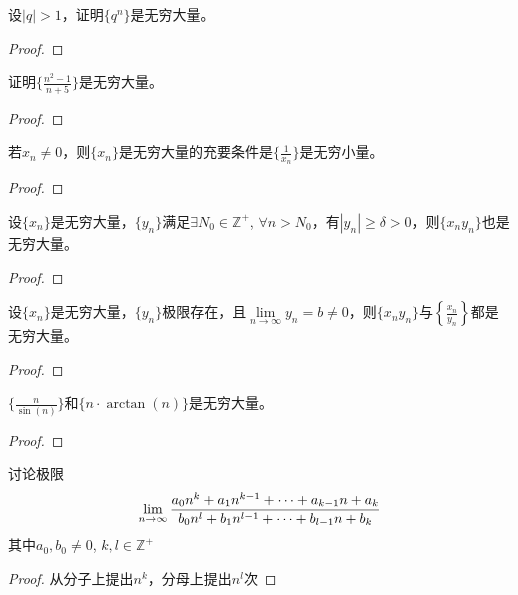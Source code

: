 \documentclass[lang=cn]{elegantbook}
\begin{document}
\begin{proposition}
    设$| q | > 1$，证明$\{ q^n \}$是无穷大量。 
\end{proposition}
\begin{proof}
    
\end{proof}

\begin{proposition}
    证明$\{ \frac{n^2-1}{n+5} \}$是无穷大量。 
\end{proposition}
\begin{proof}
    
\end{proof}

\begin{lemma}\label{lemma:inverse}
    若$x_n \neq 0$，则$\{ x_n \}$是无穷大量的充要条件是$\{ \frac{1}{x_n} \}$是无穷小量。    
\end{lemma}
\begin{proof}

\end{proof}

\begin{lemma}
    设$\{ x_n \}$是无穷大量，$\{ y_n \}$满足$\exists N_0 \in \mathbb{Z}^+$, $\forall n > N_0$，有$| y_n | \ge \delta > 0$，则$\{ x_n y_n\}$也是无穷大量。
\end{lemma}
\begin{proof}
\end{proof}

\begin{lemma}
    设$\{ x_n \}$是无穷大量，$\{ y_n \}$极限存在，且$\lim\limits_{n \to \infty}y_n = b \ne 0$，则$\{ x_n y_n\}$与$\left\{ \frac{x_n}{y_n} \right\}$都是无穷大量。
\end{lemma}
\begin{proof}
\end{proof}

\begin{proposition}
    $\{ \frac{n}{\sin(n)}\}$和$\{ n \cdot \arctan(n)\}$是无穷大量。
\end{proposition}
\begin{proof}
\end{proof}

\begin{proposition}
    讨论极限
    \[ \lim_{n \to \infty} \frac{a_0 n^k + a_1 n^{k - 1} + \cdots + a_{k - 1} n + a_k}{b_0 n^l + b_1 n^{l - 1} + \cdots + b_{l - 1} n + b_k}\]
    其中$a_0, b_0 \ne 0$, $k, l \in \mathbb{Z}^+$
\end{proposition}
\begin{proof}
    从分子上提出$n^k$，分母上提出$n^l$次
\end{proof}
\end{document}
